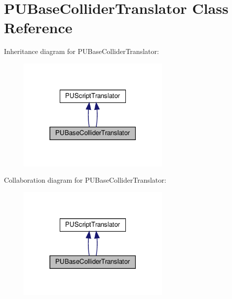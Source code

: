 \hypertarget{classPUBaseColliderTranslator}{}\section{P\+U\+Base\+Collider\+Translator Class Reference}
\label{classPUBaseColliderTranslator}


Inheritance diagram for P\+U\+Base\+Collider\+Translator\+:
\nopagebreak
\begin{figure}[H]
\begin{center}
\leavevmode
\includegraphics[width=210pt]{classPUBaseColliderTranslator__inherit__graph}
\end{center}
\end{figure}


Collaboration diagram for P\+U\+Base\+Collider\+Translator\+:
\nopagebreak
\begin{figure}[H]
\begin{center}
\leavevmode
\includegraphics[width=210pt]{classPUBaseColliderTranslator__coll__graph}
\end{center}
\end{figure}
